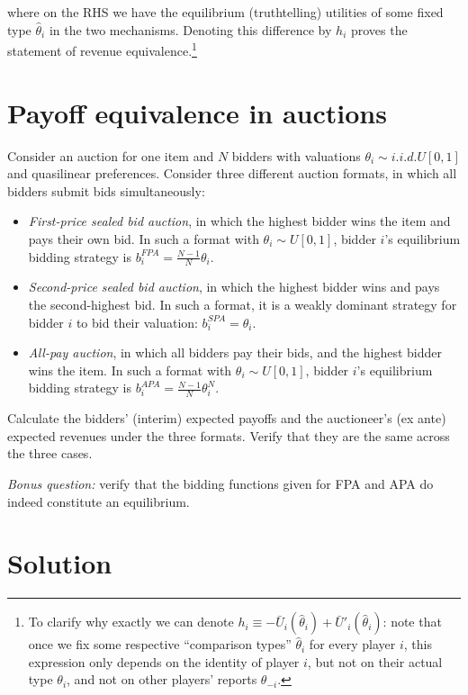 \documentclass[a4paper]{article}
\newif\ifsolutions
\begin{document}
	where on the RHS we have the equilibrium (truthtelling) utilities of some fixed type $\hat{\theta}_i$ in the two mechanisms. Denoting this difference by $h_i$ proves the statement of revenue equivalence.\footnote{To clarify why exactly we can denote $h_i \equiv -\bar{U}_i(\hat{\theta}_i) + \bar{U}'_i(\hat{\theta}_i)$: note that once we fix some respective ``comparison types'' $\hat{\theta}_i$ for every player $i$, this expression only depends on the identity of player $i$, but not on their actual type $\theta_i$, and not on other players' reports $\theta_{-i}$.}
\fi



\section{Payoff equivalence in auctions}

Consider an auction for one item and $N$ bidders with valuations $\theta_i \sim i.i.d.U[0,1]$ and quasilinear preferences. Consider three different auction formats, in which all bidders submit bids simultaneously:
\begin{itemize}
	\item \emph{First-price sealed bid auction}, in which the highest bidder wins the item and pays their own bid. In such a format with $\theta_i \sim U[0,1]$, bidder $i$'s equilibrium bidding strategy is $b_i^{FPA} = \frac{N-1}{N} \theta_i$.
	\item \emph{Second-price sealed bid auction}, in which the highest bidder wins and pays the second-highest bid. In such a format, it is a weakly dominant strategy for bidder $i$ to bid their valuation: $b_i^{SPA} = \theta_i$.
	\item \emph{All-pay auction}, in which all bidders pay their bids, and the highest bidder wins the item. In such a format with $\theta_i \sim U[0,1]$, bidder $i$'s equilibrium bidding strategy is $b_i^{APA} = \frac{N-1}{N} \theta_i^N$.
\end{itemize}
Calculate the bidders' (interim) expected payoffs and the auctioneer's (ex ante) expected revenues under the three formats. Verify that they are the same across the three cases.

\emph{Bonus question:} verify that the bidding functions given for FPA and APA do indeed constitute an equilibrium.

\ifsolutions
\section*{Solution}
\end{document}
